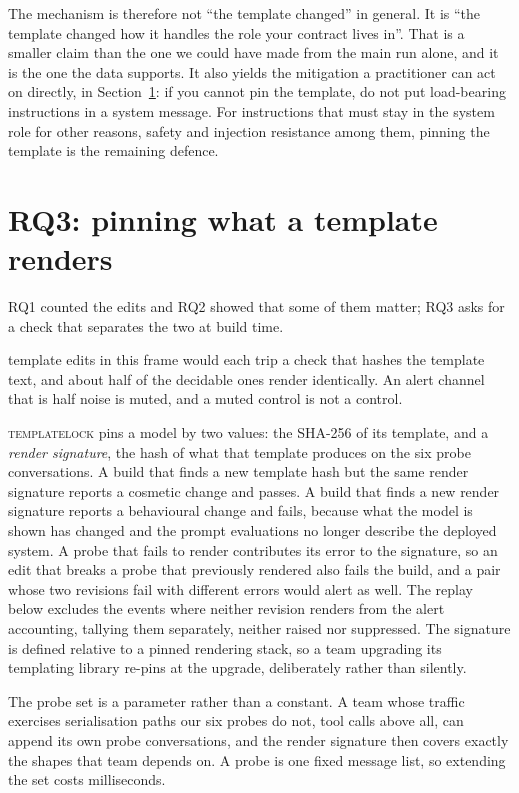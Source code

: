 The mechanism is therefore not ``the template changed'' in general. It is ``the template changed how it
handles the role your contract lives in''. That is a smaller claim than the one we could have made
from the main run alone, and it is the one the data supports. It also yields the mitigation a
practitioner can act on directly, in Section~\ref{sec:check}: if you cannot pin the template, do not put
load-bearing instructions in a system message. For instructions that must stay in the system role
for other reasons, safety and injection resistance among them, pinning the template is the
remaining defence.

\section{RQ3: pinning what a template renders}
\label{sec:check}

RQ1 counted the edits and RQ2 showed that some of them matter; RQ3 asks for a check that separates
the two at build time.

\NEvents{} template edits in this frame would each trip a check that hashes the template text, and
about half of the decidable ones render identically. An alert channel that is half
noise is muted, and a muted control is not a control.

\textsc{templatelock} pins a model by two values: the SHA-256 of its template, and a
\emph{render signature}, the hash of what that template produces on the six probe conversations. A
build that finds a new template hash but the same render signature reports a cosmetic change and
passes. A build that finds a new render signature reports a behavioural change and fails, because
what the model is shown has changed and the prompt evaluations no longer describe the deployed
system. A probe that fails to render contributes its error to the signature, so an edit that
breaks a probe that previously rendered also fails the build, and a pair whose two revisions fail
with different errors would alert as well. The replay below excludes the \NEventsUndecidable{}
events where neither revision renders from the alert accounting, tallying them separately, neither
raised nor suppressed. The signature is defined relative to a pinned rendering stack, so a team upgrading
its templating library re-pins at the upgrade, deliberately rather than silently.

The probe set is a parameter rather than a constant. A team whose traffic exercises serialisation
paths our six probes do not, tool calls above all, can append its own probe conversations, and the
render signature then covers exactly the shapes that team depends on. A probe is one fixed message
list, so extending the set costs milliseconds.

